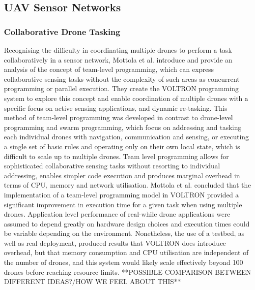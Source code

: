 \subsection{UAV Sensor Networks}

\subsubsection{Collaborative Drone Tasking}
Recognising the difficulty in coordinating multiple drones to perform a task collaboratively in a sensor network, Mottola et al. \cite{mottola2014} introduce and provide an analysis of the concept of team-level programming, which can express collaborative sensing tasks without the complexity of such areas as concurrent programming or parallel execution. They create the VOLTRON programming system to explore this concept and enable coordination of multiple drones with a specific focus on active sensing applications, and dynamic re-tasking.
This method of team-level programming was developed in contrast to drone-level programming and swarm programming, which focus on addressing and tasking each individual drones with navigation, communication and sensing, or executing a single set of basic rules and operating only on their own local state, which is difficult to scale up to multiple drones. Team level programming allows for sophisticated collaborative sensing tasks without resorting to individual addressing, enables simpler code execution and produces marginal overhead in terms of CPU, memory and network utilisation.
Mottola et al. concluded that the implementation of a team-level programming model in VOLTRON provided a significant improvement in execution time for a given task when using multiple drones. Application level performance of real-while drone applications were assumed to depend greatly on hardware design choices and execution times could be variable depending on the environment. Nonetheless, the use of a testbed, as well as real deployment, produced results that VOLTRON does introduce overhead, but that memory consumption and CPU utilisation are independent of the number of drones, and this system would likely scale effectively beyond 100 drones before reaching resource limits. 
**POSSIBLE COMPARISON BETWEEN DIFFERENT IDEAS?/HOW WE FEEL ABOUT THIS**

